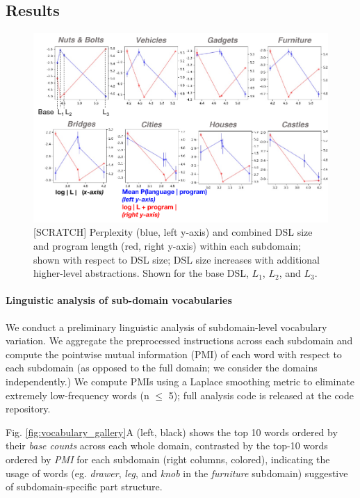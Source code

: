 \documentclass[10pt,letterpaper]{article}
\begin{document}
\subsection{Results}
\begin{figure}[b!]
  \begin{center}
  \includegraphics[width=\linewidth]{figures/fig_perplexity_costs_narrow.pdf}
  \caption{[SCRATCH] Perplexity (blue, left y-axis) and combined DSL size and program length (red, right y-axis) within each subdomain; shown with respect to DSL size; DSL size increases with additional higher-level abstractions. Shown for the base DSL, $L_1$, $L_2$, and $L_3$.}\label{fig:perplexity-length}
  \end{center}
\end{figure}

\paragraph{Linguistic analysis of sub-domain vocabularies} %
We conduct a preliminary linguistic analysis of subdomain-level vocabulary variation. We aggregate the preprocessed instructions across each subdomain and compute the pointwise mutual information (PMI) of each word with respect to each subdomain (as opposed to the full domain; we consider the domains independently.) We compute PMIs using a Laplace smoothing metric to eliminate extremely low-frequency words (n $\leq$ 5); full analysis code is released at the code repository.

Fig. \ref{fig:vocabulary_gallery}A (left, black) shows the top 10 words ordered by their \textit{base counts} across each whole domain, contrasted by the top-10 words ordered by \textit{PMI} for each subdomain (right columns, colored), indicating the usage of words (eg. \textit{drawer}, \textit{leg}, and \textit{knob} in the \textit{furniture} subdomain) suggestive of subdomain-specific part structure. 
\end{document}
